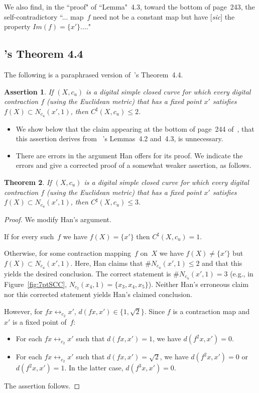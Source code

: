 \documentclass{article}
\newtheorem{thm}{Theorem}
\newtheorem{assert}[thm]{Assertion}
\numberwithin{thm}{section}
\newcommand{\adj}{\leftrightarrow}
\begin{document}
We also find, in the ``proof"
of ``Lemma"~4.3, toward the
bottom of page~243, the
self-contradictory ``... 
map~$f$ need not be a constant 
map but have [{\em sic}] the property $Im (f) = \{ x'\}$...."


\subsection{\cite{Han19}'s Theorem 4.4}
The following is a paraphrased 
version of~\cite{Han19}'s Theorem~4.4.
\begin{assert}
    \label{Han4.4}
   If $(X,c_u)$ is a digital simple
   closed curve for
   which every digital contraction $f$
   (using the Euclidean metric) that has a fixed
   point $x'$ satisfies
   $f(X) \subset N_{c_u}(x',1)$,
   then $C^{\sharp}(X,c_u) \le 2$.
\end{assert}

\begin{itemize}
\item We show below that
the claim appearing at the bottom of page~244 
of~\cite{Han19}, that this
assertion derives from
~\cite{Han19}'s Lemmas~4.2
and~4.3, is unnecessary.
\item There are errors in the
argument Han offers for its 
proof. We indicate the errors
and give a corrected proof of a somewhat
weaker assertion, as follows.
\end{itemize}

\begin{thm}
    \label{correctHan4.4}
       If $(X,c_u)$ is a digital simple
   closed curve for
   which every digital contraction $f$
   (using the Euclidean metric) that has a fixed
   point $x'$ satisfies
   $f(X) \subset N_{c_u}(x',1)$,
   then $C^{\sharp}(X,c_u) \le 3$.
\end{thm}

\begin{proof}
    We modify Han's
    argument.

    If for every such~$f$ we
    have $f(X) = \{x'\}$ then
    $C^{\sharp}(X,c_u)=1$.

    Otherwise, for some 
    contraction mapping~$f$
    on~$X$ we
    have $f(X) \neq \{x'\}$ but $f(X) \subset N_{c_u}(x',1)$. Here,
    Han claims that
    $\#N_{c_u}(x',1) \le 2$
    and that this yields the
    desired conclusion. 
    The correct statement is
    $\#N_{c_u}(x',1) = 3$
    (e.g., in Figure~\ref{fig:7ptSCC}, 
    $N_{c_2}(x_4,1)=\{x_3,x_4,x_5\}$).
    Neither Han's erroneous claim nor this corrected
    statement yields Han's claimed conclusion. 

However, for
    $fx \adj_{c_2} x'$, $d(fx,x') \in \{1, \sqrt{2} \}$.
    Since $f$ is a contraction map and $x'$
    is a fixed point of~$f$:
\begin{itemize}
    \item For each $fx \adj_{c_2} x'$ such that
          $d(fx,x')=1$, we have $d(f^2x,x') = 0$.
    \item For each $fx \adj_{c_2} x'$ such that
          $d(fx,x')=\sqrt{2}$, we have $d(f^2x,x') = 0$
          or $d(f^2x,x') = 1$. In the latter case,
          $d(f^3x,x')=0$.
\end{itemize}
The assertion follows.
\end{proof}
\end{document}
